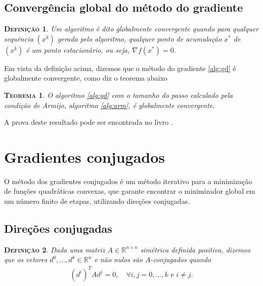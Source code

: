 \documentclass[
	12pt,				%
    oneside,			%
	a4paper,			%
	english,			%
	french,				%
	spanish,			%
	brazil,				%
	]{abntex2}
\newtheorem{theorem}{\scshape Teorema}[section]
\newtheorem{definicao}{\scshape Defini\c{c}\~ao}[section]
\begin{document}
        \subsection{Convergência global do método do gradiente}
            \begin{definicao}
                Um algoritmo é dito globalmente convergente quando para qualquer sequência $(x^k)$ gerada pelo algoritmo, qualquer ponto de acumulação $x^{*}$ de $(x^k)$ é um ponto estacionário, ou seja, $\nabla f(x^{*}) = 0$.
            \end{definicao}

            Em vista da definição acima, dizemos que o método do gradiente \ref{alg:gd} é globalmente convergente, como diz o teorema abaixo

            \begin{theorem}
               O algoritmo \ref{alg:gd} com o tamanho do passo calculado pela condição de Armijo, algoritmo \ref{alg:arm}, é globalmente convergente.
            \end{theorem}

            A prova deste resultado pode ser encontrada no livro \cite[p. 59]{elzad}.

    \section{Gradientes conjugados}
        O método dos gradientes conjugados é um método iterativo para a minimização de funções quadráticas convexas, que garante encontrar o minimizador global em um número finito de etapas, utilizando direções conjugadas.
        \subsection{Direções conjugadas}
        \begin{definicao}
            Dada uma matriz $A \in \mathbb{R}^{ n\times n}$ simétrica definida positiva, dizemos que os vetores $d^0,...,d^k \in \mathbb{R}^n$ e não nulos são $A$-conjugados quando
            \begin{gather*}
                 (d^i)^TAd^j = 0, \quad \forall i,j = 0,...,k \mbox{ e } i\neq j.
            \end{gather*}
        \end{definicao}
\end{document}
